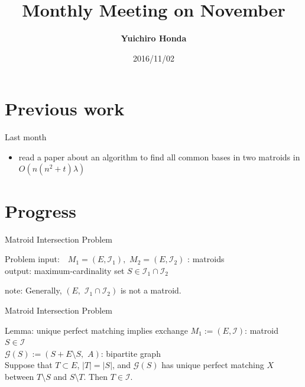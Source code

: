 \documentclass[11pt,xcolor=dvipsnames,table,dvipdfmx]{beamer}
\title{Monthly Meeting on November}
\author{\textbf{Yuichiro Honda}}
\date{2016/11/02}
\institute{Morita lab. M1}
\begin{document}
\maketitle

\section{Previous work}
\begin{frame}{Last month}
 \begin{itemize}
  \item read a paper about an algorithm to find all common bases in two matroids in $O(n(n^2+t)\lambda)$
 \end{itemize}
\end{frame}

\section{Progress}
\begin{frame}{Matroid Intersection Problem}
 \begin{block}{Problem}
  input: \,\, $M_1 = (E, \mathcal{I}_1),\,\,M_2 = (E, \mathcal{I}_2)$ : matroids\\
  output: maximum-cardinality set $S \in \mathcal{I}_1 \cap \mathcal{I}_2$
 \end{block}
 note: Generally, $(E,\,\,\mathcal{I}_1 \cap \mathcal{I}_2)$ is not a matroid.
\end{frame}

\begin{frame}{Matroid Intersection Problem}
 \begin{block}{Lemma: unique perfect matching implies exchange}
  $M_1 := (E, \mathcal{I})$: matroid\\
  $S \in \mathcal{I}$\\
  $\mathcal{G}(S) := (S+E\setminus S,\,\,A)$: bipartite graph\\
  Suppose that $T \subset E$,\,\,$|T|=|S|$, and $\mathcal{G}(S)$ has unique perfect matching $X$ between $T \setminus S$ and $S \setminus T$. Then $T \in \mathcal{I}$.
 \end{block}
\end{frame}
\end{document}
